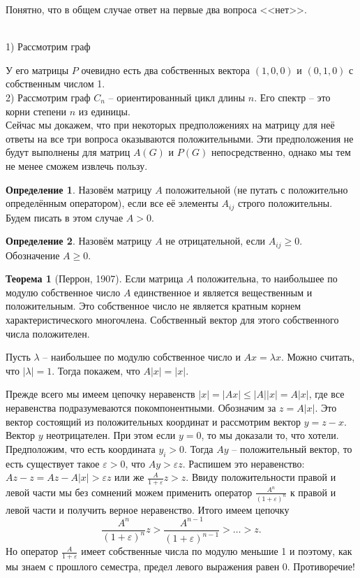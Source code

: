 \documentclass[10pt,a4paper,oneside]{book}
\theoremstyle{definition}
\newtheorem*{defn}{{\color{yellow!30!red} Определение}}
\newtheorem{thm}{{\color{red!40!black} Теорема}}
\def\exm{\noindent {\bf Примеры:}}
\def\eps{\varepsilon}
\def\thrm{\begin{thm}}
\def\ethrm{\end{thm}}
\def\dfn{\begin{defn}}
\def\edfn{\end{defn}}
\begin{document}
Понятно, что в общем случае ответ на первые два вопроса <<нет>>.

\exm \\
1) Рассмотрим граф 
\begin{center}
\end{center}
У его матрицы $P$ очевидно есть два собственных вектора $(1,0,0)$ и $(0,1,0)$ с собственным числом 1.\\
2) Рассмотрим граф $C_n$ -- ориентированный цикл длины $n$. Его спектр -- это корни степени $n$ из единицы.\\

Сейчас мы докажем, что при некоторых предположениях на матрицу для неё ответы на все три вопроса оказываются положительными. Эти предположения не будут выполнены для матриц $A(G)$ и  $P(G)$ непосредственно, однако мы тем не менее сможем извлечь пользу.

\dfn Назовём матрицу $A$ положительной (не путать с положительно определённым оператором), если все её элементы $A_{ij}$ строго положительны. Будем писать в этом случае $A>0$.
\edfn

\dfn Назовём матрицу  $A$ не отрицательной, если $A_{ij}\geq 0$. Обозначение $A \geq 0$.
\edfn

\thrm[Перрон, 1907] Если матрица $A$ положительна, то наибольшее по модулю собственное число $A$ единственное и является вещественным и положительным. Это собственное число не является кратным корнем характеристического многочлена. Собственный вектор для этого собственного числа положителен.
\ethrm
\proof Пусть $\lambda$ -- наибольшее по модулю собственное число и $Ax=\lambda x$. Можно считать, что $|\lambda|=1$. Тогда покажем, что $A|x|=|x|$.

Прежде всего мы имеем цепочку неравенств $|x|=|Ax|\leq |A||x|=A|x|$, где все неравенства подразумеваются покомпонентными. Обозначим за $z=A|x|$. Это вектор состоящий из положительных координат и рассмотрим вектор $y=z-x$. Вектор $y$ неотрицателен. При этом если $y=0$, то мы доказали то, что хотели. Предположим, что есть координата $y_i>0$. Тогда $Ay$ -- положительный вектор, то есть существует такое $\eps>0$, что $Ay>\eps z$. Распишем это неравенство: $Az - z= Az-A|x|> \eps z$ или же $\frac{A}{1+\eps}z>z$. Ввиду положительности правой и левой части мы без сомнений можем применить оператор $\frac{A^n}{(1+\eps)^n}$ к правой и левой части и получить верное неравенство. Итого имеем цепочку 
$$\frac{A^n}{(1+\eps)^n}z>\frac{A^{n-1}}{(1+\eps)^{n-1}}> \dots > z.$$
Но оператор $\frac{A}{1+\eps}$ имеет собственные числа по модулю меньшие 1 и поэтому, как мы знаем с прошлого семестра, предел левого выражения равен 0. Противоречие!
\end{document}

